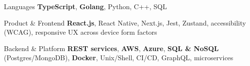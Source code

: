 
\begin{cvskills}

  \cvskill
  {Languages}
  {\textbf{TypeScript}, \textbf{Golang}, Python, C++, SQL}

  \cvskill
  {Product \& Frontend}
  {\textbf{React.js}, React Native, Next.js, Jest, Zustand, accessibility (WCAG), responsive UX across device form factors}

  \cvskill
  {Backend \& Platform}
  {\textbf{REST services}, \textbf{AWS}, \textbf{Azure}, \textbf{SQL \& NoSQL} (Postgres/MongoDB), \textbf{Docker}, Unix/Shell, CI/CD, GraphQL, microservices}


\end{cvskills}
